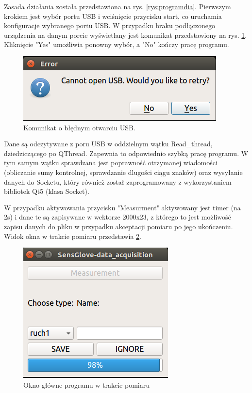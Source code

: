 ﻿\documentclass{article}
\begin{document}
Zasada działania została przedstawiona na rys. \ref{rys:programdia}. 
Pierwszym krokiem jest wybór portu USB i wciśnięcie przycisku start, co uruchamia konfiguracje wybranego portu USB. W przypadku braku podłączonego urządzenia na danym porcie wyświetlany jest komunikat przedstawiony na rys. \ref{rys:oknousb}. Kliknięcie "Yes" umożliwia ponowny wybór, a "No" kończy pracę programu.\\
\begin{figure}[h!]
    \begin{center}
    \includegraphics[scale=0.6]{oknousb.png}
    \caption{Komunikat o błędnym otwarciu USB.}
    \label{rys:oknousb}
    \end{center}
\end{figure}
Dane są odczytywane z poru USB w oddzielnym wątku Read\_thread, dziedziczącego po QThread. Zapewnia to odpowiednio szybką pracę programu. W tym samym wątku sprawdzana jest poprawność otrzymanej wiadomości (obliczanie sumy kontrolnej, sprawdzanie dlugości ciągu znaków) oraz wysyłanie danych do Socketu, który również został zaprogramowany z wykorzystaniem bibliotek Qt5 (klasa Socket).

W przypadku aktywowania przycisku "Measurment" aktywowany jest timer (na 2s) i dane te są zapisywane w wektorze 2000x23, z którego to jest możliwość zapisu danych do pliku w przypadku akceptacji pomiaru po jego ukończeniu. Widok okna w trakcie pomiaru przedstawia \ref{rys:oknopomiar}.
\begin{figure}[h!]
    \centering
    \includegraphics[scale=0.6]{oknopomiar.png}
    \caption{Okno główne programu w trakcie pomiaru}
    \label{rys:oknopomiar}
\end{figure}
\end{document}
